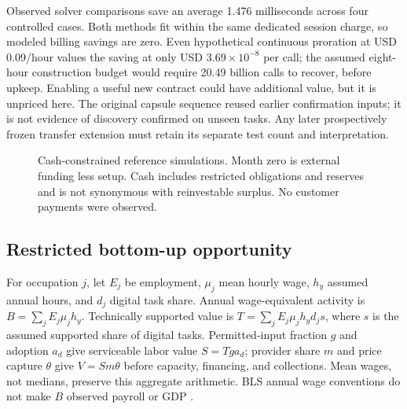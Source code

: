 Observed solver comparisons save an average 1.476 milliseconds across four
controlled cases. Both methods fit within the same dedicated session charge,
so modeled billing savings are zero. Even hypothetical continuous proration
at USD 0.09/hour values the saving at only USD $3.69\times10^{-8}$ per call;
the assumed eight-hour construction budget would require 20.49 billion calls
to recover, before upkeep. Enabling a useful new contract could have additional
value, but it is unpriced here. The original capsule sequence reused earlier
confirmation inputs; it is not evidence of discovery confirmed on unseen
tasks. Any later prospectively frozen transfer extension must retain its
separate test count and interpretation.

\begin{figure}[htbp]\centering
\caption{Cash-constrained reference simulations. Month zero is external funding less setup. Cash includes restricted obligations and reserves and is not synonymous with reinvestable surplus. No customer payments were observed.}\label{fig:cash}
\end{figure}
\subsection{Restricted bottom-up opportunity}

For occupation $j$, let $E_j$ be employment, $\mu_j$ mean hourly wage, $h_y$
assumed annual hours, and $d_j$ digital task share. Annual wage-equivalent
activity is $B=\sum_j E_j\mu_jh_y$. Technically supported value is
$T=\sum_j E_j\mu_jh_yd_js$, where $s$ is the assumed supported share of digital
tasks. Permitted-input fraction $g$ and adoption $a_d$ give serviceable labor
value $S=Tga_d$; provider share $m$ and price capture $\theta$ give
$V=Sm\theta$ before capacity, financing, and collections. Mean wages, not
medians, preserve this aggregate arithmetic. BLS annual wage conventions do
not make $B$ observed payroll or GDP \cite{blsoewsfaq}.

